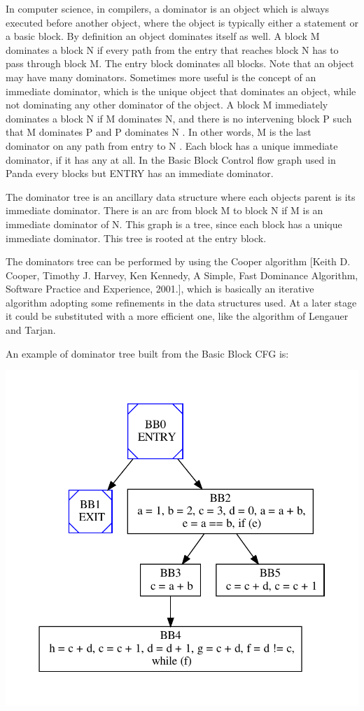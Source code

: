 In computer science, in compilers, a dominator is an object which is always executed before another object, where the object is typically either a statement or a basic block. By definition an object dominates itself as well. A block M dominates a block N if every path from the entry that reaches block N has to pass through block M. The entry block dominates all blocks. Note that an object may have many dominators. Sometimes more useful is the concept of an immediate dominator, which is the unique object that dominates an object, while not dominating any other dominator of the object. A block M immediately dominates a block N if M dominates N, and there is no intervening block P such that M dominates P and P dominates N . In other words, M is the last dominator on any path from entry to N . Each block has a unique immediate dominator, if it has any at all. In the Basic Block Control flow graph used in Panda every blocks but E\+N\+T\+RY has an immediate dominator.

The dominator tree is an ancillary data structure where each object\textquotesingle{}s parent is its immediate dominator. There is an arc from block M to block N if M is an immediate dominator of N. This graph is a tree, since each block has a unique immediate dominator. This tree is rooted at the entry block.

The dominators tree can be performed by using the Cooper algorithm \mbox{[}Keith D. Cooper, Timothy J. Harvey, Ken Kennedy, A Simple, Fast Dominance Algorithm, Software Practice and Experience, 2001.\mbox{]}, which is basically an iterative algorithm adopting some refinements in the data structures used. At a later stage it could be substituted with a more efficient one, like the algorithm of Lengauer and Tarjan.

An example of dominator tree built from the Basic Block C\+FG is\+: 
\begin{DoxyImageNoCaption}
  \mbox{\includegraphics[width=\textwidth,height=\textheight/2,keepaspectratio=true]{dot_inline_dotgraph_10}}
\end{DoxyImageNoCaption}
 

